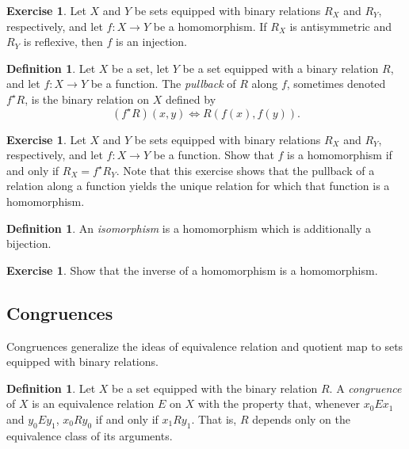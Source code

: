 \documentclass[letterpaper]{article}
\theoremstyle{definition}
\newtheorem{definition}[theorem]{Definition}
\newtheorem{exercise}[theorem]{Exercise}
\newcommand{\defterm}{\emph}
\begin{document}
\begin{exercise}
  Let \(X\) and \(Y\) be sets equipped with binary relations \(R_X\)
  and \(R_Y\), respectively, and let \(f:X \to Y\) be a homomorphism.
  If \(R_X\) is antisymmetric and \(R_Y\) is reflexive, then \(f\) is
  an injection.
\end{exercise}

\begin{definition}
  Let \(X\) be a set, let \(Y\) be a set equipped with a binary
  relation \(R\), and let \(f:X \to Y\) be a function.  The
  \defterm{pullback} of \(R\) along \(f\), sometimes denoted \(f^\star
  R\), is the binary relation on \(X\) defined by
  \[(f^\star R)(x, y) \iff R(f(x), f(y)) \text{.}\]
\end{definition}

\begin{exercise}
  Let \(X\) and \(Y\) be sets equipped with binary relations \(R_X\)
  and \(R_Y\), respectively, and let \(f:X \to Y\) be a function.
  Show that \(f\) is a homomorphism if and only if \(R_X = f^\star
  R_Y\).  Note that this exercise shows that the pullback of a
  relation along a function yields the unique relation for which that
  function is a homomorphism.
\end{exercise}

\begin{definition}
  An \defterm{isomorphism} is a homomorphism which is additionally a
  bijection.
\end{definition}

\begin{exercise}
  Show that the inverse of a homomorphism is a homomorphism.
\end{exercise}

\subsection{Congruences}
Congruences generalize the ideas of equivalence relation and quotient
map to sets equipped with binary relations.

\begin{definition}
  Let \(X\) be a set equipped with the binary relation \(R\).  A
  \defterm{congruence} of \(X\) is an equivalence relation \(E\) on
  \(X\) with the property that, whenever \(x_0Ex_1\) and \(y_0Ey_1\),
  \(x_0Ry_0\) if and only if \(x_1Ry_1\).  That is, \(R\) depends only
  on the equivalence class of its arguments.
\end{definition}
\end{document}
